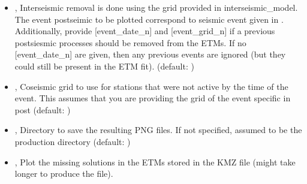 \documentclass[letterpaper,10pt,english]{sphinxmanual}
\begin{document}
\begin{itemize}
\item {} 
\sphinxAtStartPar
{\hyperref[\detokenize{com:PlotMapView.py--post}]{}} , {\hyperref[\detokenize{com:PlotMapView.py---postseismic}]{}}  \sphinxhyphen{} Interseismic removal is done using the grid provided in \textendash{}interseismic\_model. The event postseimic to be plotted correspond to seismic event given in . Additionally, provide {[}event\_date\_n{]} and {[}event\_grid\_n{]} if a previous postsiesmic processes should be removed from the ETMs. If no {[}event\_date\_n{]} are given, then any previous events are ignored (but they could still be present in the ETM fit). (default: )

\item {} 
\sphinxAtStartPar
{\hyperref[\detokenize{com:PlotMapView.py--co}]{}} , {\hyperref[\detokenize{com:PlotMapView.py---coseismic}]{}}  \sphinxhyphen{} Coseismic grid to use for stations that were not active by the time of the event. This assumes that you are providing the grid of the event specific in \sphinxhyphen{}post (default: )

\item {} 
\sphinxAtStartPar
{\hyperref[\detokenize{com:PlotMapView.py--dir}]{}} , {\hyperref[\detokenize{com:PlotMapView.py---directory}]{}}  \sphinxhyphen{} Directory to save the resulting PNG files. If not specified, assumed to be the production directory (default: )

\item {} 
\sphinxAtStartPar
{\hyperref[\detokenize{com:PlotMapView.py--missing}]{}}, {\hyperref[\detokenize{com:PlotMapView.py---plot_missing_solutions}]{}} \sphinxhyphen{} Plot the missing solutions in the ETMs stored in the KMZ file (might take longer to produce the file).

\end{itemize}
\end{document}
